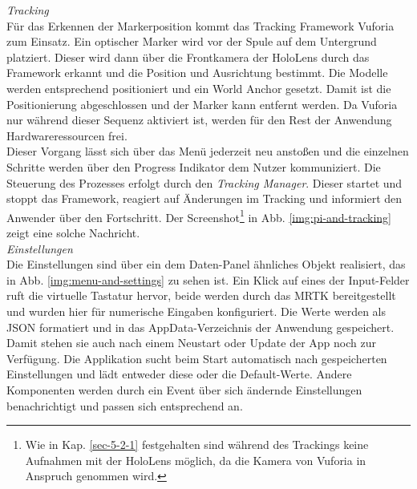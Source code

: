 \textit{Tracking}\\
Für das Erkennen der Markerposition kommt das Tracking Framework Vuforia zum Einsatz. Ein optischer Marker wird vor der Spule auf dem Untergrund platziert. Dieser wird dann über die Frontkamera der HoloLens durch das Framework erkannt und die Position und Ausrichtung bestimmt. Die Modelle werden entsprechend positioniert und ein World Anchor gesetzt. Damit ist die Positionierung abgeschlossen und der Marker kann entfernt werden. Da Vuforia nur während dieser Sequenz aktiviert ist, werden für den Rest der Anwendung Hardwareressourcen frei.\\

Dieser Vorgang lässt sich über das Menü jederzeit neu anstoßen und die einzelnen Schritte werden über den Progress Indikator dem Nutzer kommuniziert. Die Steuerung des Prozesses erfolgt durch den \textit{Tracking Manager}. Dieser startet und stoppt das Framework, reagiert auf Änderungen im Tracking und informiert den Anwender über den Fortschritt. Der Screenshot\footnote{Wie in Kap. \ref{sec-5-2-1} festgehalten sind während des Trackings keine Aufnahmen mit der HoloLens möglich, da die Kamera von Vuforia in Anspruch genommen wird.\nopagebreak} in Abb. \ref{img:pi-and-tracking} zeigt eine solche Nachricht.\\

\textit{Einstellungen}\\
Die Einstellungen sind über ein dem Daten-Panel ähnliches Objekt realisiert, das in Abb. \ref{img:menu-and-settings} zu sehen ist. Ein Klick auf eines der Input-Felder ruft die virtuelle Tastatur hervor, beide werden durch das MRTK bereitgestellt und wurden hier für numerische Eingaben konfiguriert. Die Werte werden als JSON formatiert und in das AppData-Verzeichnis der Anwendung gespeichert. Damit stehen sie auch nach einem Neustart oder Update der App noch zur Verfügung. Die Applikation sucht beim Start automatisch nach gespeicherten Einstellungen und lädt entweder diese oder die Default-Werte. Andere Komponenten werden durch ein Event über sich ändernde Einstellungen benachrichtigt und passen sich entsprechend an.\\

